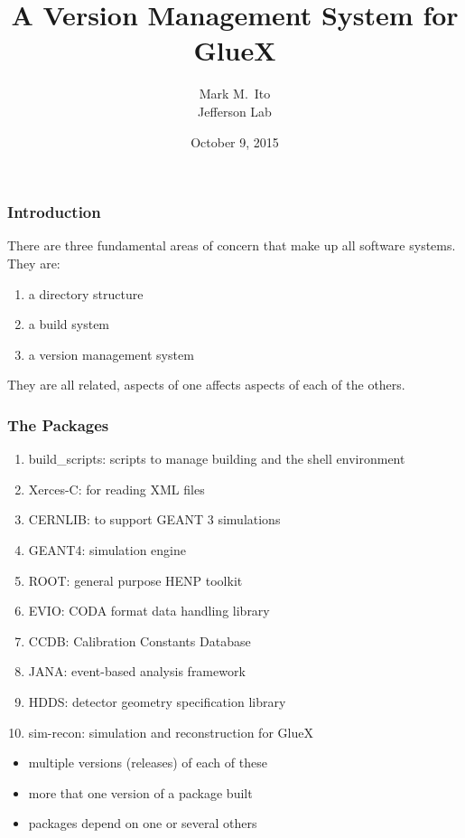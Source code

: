 \documentclass[xcolor=dvipsnames,hyperref={pdfpagelabels=false}]{beamer}
\title{A Version Management System for GlueX}
\author{Mark M.\ Ito \\ \medskip Jefferson Lab}
\date{October 9, 2015}
\begin{document}
\maketitle

\begin{frame}\frametitle{Introduction}
There are three fundamental areas of concern that make up all software
systems. They are:

\begin{enumerate}
\item a directory structure
\item a build system
\item a version management system
\end{enumerate}

They are all related, aspects of one affects aspects of each of the others.

\end{frame}\begin{frame}\frametitle{The Packages}

\begin{enumerate}
\item build\_scripts: scripts to manage building and the shell environment
\item Xerces-C: for reading XML files
\item CERNLIB: to support GEANT 3 simulations
\item GEANT4: simulation engine
\item ROOT: general purpose HENP toolkit
\item EVIO: CODA format data handling library
\item CCDB: Calibration Constants Database
\item JANA: event-based analysis framework
\item HDDS: detector geometry specification library 
\item sim-recon: simulation and reconstruction for GlueX
\end{enumerate}

\begin{itemize}
\item multiple versions (releases) of each of these
\item more that one version of a package built
\item packages depend on one or several others
\end{itemize}

\end{frame}
\end{document}
